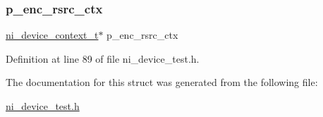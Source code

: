 \subsubsection{\texorpdfstring{p\_enc\_rsrc\_ctx}{p\_enc\_rsrc\_ctx}}
{\footnotesize\ttfamily \mbox{\hyperlink{ni__rsrc__api_8h_a880a361e6e867b45d102656e813a046f}{ni\+\_\+device\+\_\+context\+\_\+t}}$\ast$ p\+\_\+enc\+\_\+rsrc\+\_\+ctx}



Definition at line 89 of file ni\+\_\+device\+\_\+test.\+h.



The documentation for this struct was generated from the following file\+:\begin{DoxyCompactItemize}
\item 
\mbox{\hyperlink{ni__device__test_8h}{ni\+\_\+device\+\_\+test.\+h}}\end{DoxyCompactItemize}
